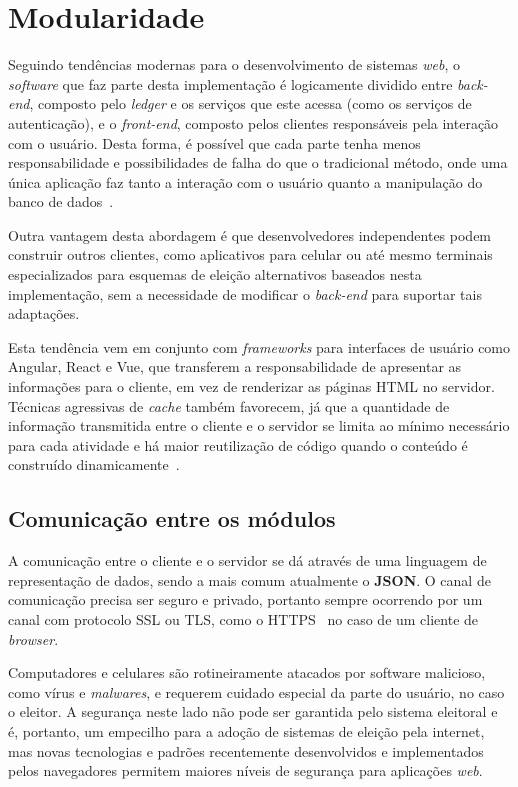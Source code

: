 \section{Modularidade}

Seguindo tendências modernas para o desenvolvimento de sistemas \textit{web}, o
\textit{software} que faz parte desta implementação é logicamente dividido
entre \textit{back-end}, composto pelo \textit{ledger} e os serviços que este
acessa (como os serviços de autenticação), e o \textit{front-end}, composto
pelos clientes responsáveis pela interação com o usuário. Desta forma, é
possível que cada parte tenha menos responsabilidade e possibilidades de falha
do que o tradicional método, onde uma única aplicação faz tanto a interação com
o usuário quanto a manipulação do banco de dados~\cite{lanthaler2012using}.

Outra vantagem desta abordagem é que desenvolvedores independentes podem
construir outros clientes, como aplicativos para celular ou até mesmo terminais
especializados para esquemas de eleição alternativos baseados nesta
implementação, sem a necessidade de modificar o \textit{back-end} para suportar
tais adaptações.

Esta tendência vem em conjunto com \textit{frameworks} para interfaces de
usuário como Angular, React e Vue, que transferem a responsabilidade de
apresentar as informações para o cliente, em vez de renderizar as páginas HTML
no servidor. Técnicas agressivas de \textit{cache} também favorecem, já que a
quantidade de informação transmitida entre o cliente e o servidor se limita ao
mínimo necessário para cada atividade e há maior reutilização de código quando
o conteúdo é construído dinamicamente~\cite{souders2008high}.

\subsection{Comunicação entre os módulos}

A comunicação entre o cliente e o servidor se dá através de uma linguagem de
representação de dados, sendo a mais comum atualmente o \textbf{JSON}. O canal
de comunicação precisa ser seguro e privado, portanto sempre ocorrendo por um
canal com protocolo SSL ou TLS, como o HTTPS~\cite{rfc2818} no caso de um
cliente de \textit{browser}.

Computadores e celulares são rotineiramente atacados por software malicioso,
como vírus e \textit{malwares}, e requerem cuidado especial da parte do
usuário, no caso o eleitor. A segurança neste lado não pode ser garantida pelo
sistema eleitoral e é, portanto, um empecilho para a adoção de sistemas de
eleição pela internet, mas novas tecnologias e padrões recentemente
desenvolvidos e implementados pelos navegadores permitem maiores níveis de
segurança para aplicações \textit{web}.

